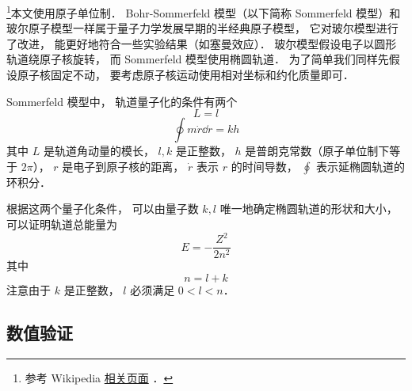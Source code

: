 

\footnote{参考 Wikipedia \href{https://en.wikipedia.org/wiki/Old_quantum_theory}{相关页面}
．}本文使用原子单位制． Bohr-Sommerfeld 模型（以下简称 Sommerfeld 模型）和玻尔原子模型一样属于量子力学发展早期的半经典原子模型， 它对玻尔模型进行了改进， 能更好地符合一些实验结果（如塞曼效应）． 玻尔模型假设电子以圆形轨道绕原子核旋转， 而 Sommerfeld 模型使用椭圆轨道． 为了简单我们同样先假设原子核固定不动， 要考虑原子核运动使用相对坐标和约化质量即可．

Sommerfeld 模型中， 轨道量子化的条件有两个
\begin{equation}\label{BohrEc_eq4}
L = l
\end{equation}
\begin{equation}\label{BohrEc_eq3}
\oint m\dot r \dd{r} = kh
\end{equation}
其中 $L$ 是轨道角动量的模长， $l, k$ 是正整数， $h$ 是普朗克常数（原子单位制下等于 $2\pi$）， $r$ 是电子到原子核的距离， $\dot r$ 表示 $r$ 的时间导数， $\oint$ 表示延椭圆轨道的环积分．

根据这两个量子化条件， 可以由量子数 $k, l$ 唯一地确定椭圆轨道的形状和大小， 可以证明轨道总能量为
\begin{equation}\label{BohrEc_eq5}
E = -\frac{Z^2}{2n^2}
\end{equation}
其中
\begin{equation}\label{BohrEc_eq2}
n = l + k
\end{equation}
注意由于 $k$ 是正整数， $l$ 必须满足 $0 < l < n$．

\subsection{数值验证}

